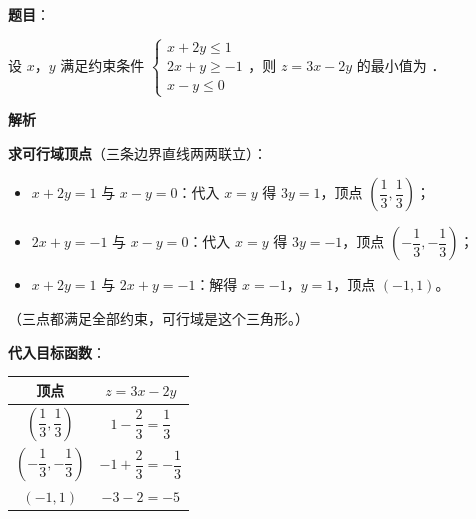 \begin{answer}

\textbf{题目}：

设 $x$，$y$ 满足约束条件 $\begin{cases}x+2y\le1\\ 2x+y\ge-1\\ x-y\le0\end{cases}$，则 $z=3x-2y$ 的最小值为 \gkblank{}．

\textbf{解析}

\textbf{求可行域顶点}（三条边界直线两两联立）：

\begin{itemize}
\item $x+2y=1$ 与 $x-y=0$：代入 $x=y$ 得 $3y=1$，顶点 $\left(\dfrac13,\dfrac13\right)$；
\item $2x+y=-1$ 与 $x-y=0$：代入 $x=y$ 得 $3y=-1$，顶点 $\left(-\dfrac13,-\dfrac13\right)$；
\item $x+2y=1$ 与 $2x+y=-1$：解得 $x=-1$，$y=1$，顶点 $(-1,1)$。
\end{itemize}

（三点都满足全部约束，可行域是这个三角形。）

\Needspace{0.25\textheight}

\textbf{代入目标函数}：

\begin{center}
\begin{tabular}{cc}
\toprule
顶点 & $z=3x-2y$ \\
\midrule
$\left(\dfrac13,\dfrac13\right)$ & $1-\dfrac23=\dfrac13$ \\
$\left(-\dfrac13,-\dfrac13\right)$ & $-1+\dfrac23=-\dfrac13$ \\
$(-1,1)$ & $-3-2=\boxed{-5}$ \\
\bottomrule
\end{tabular}
\end{center}


\par\medskip

\end{answer}
